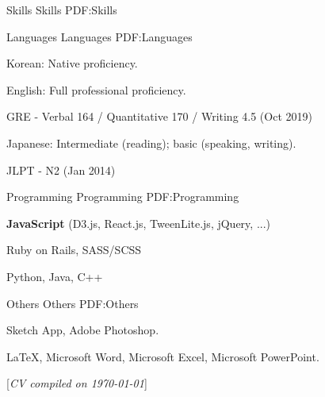 \documentclass[letterpaper,MMMyyyy,nonstopmode]{template}
\newcommand{\CVNote}{CV compiled on {\today}}
\begin{document}
\begin{Body}
\BigGap
\Section
{Skills}
{Skills}
{PDF:Skills}

\SubSection
{Languages}
{Languages}
{PDF:Languages}

\BigGap
\BulletItem
Korean: Native proficiency.

\Gap
\BulletItem
English: Full professional proficiency.
\begin{Detail}
\SubBulletItem
GRE - Verbal 164 / Quantitative 170 / Writing 4.5 (Oct 2019)
\end{Detail}

\Gap
\BulletItem
Japanese: Intermediate (reading); basic (speaking, writing).
\begin{Detail}
\SubBulletItem
JLPT - N2 (Jan 2014)
\end{Detail}

\BigGap
\SubSection
{Programming}
{Programming}
{PDF:Programming}

\BigGap
\BulletItem
\textbf{JavaScript} (D3.js, React.js, TweenLite.js, jQuery, ...)

\Gap
\BulletItem
Ruby on Rails,
SASS/SCSS

\Gap
\BulletItem
Python, Java, C++

\BigGap
\SubSection
{Others}
{Others}
{PDF:Others}

\BigGap
\BulletItem
Sketch App,
Adobe Photoshop.

\Gap
\BulletItem
{\LaTeX},
Microsoft Word,
Microsoft Excel,
Microsoft PowerPoint.

\end{Body}


\BigGap
\UseNoteFont%
\null\hfill%
[\textit{\CVNote}]
\end{document}

